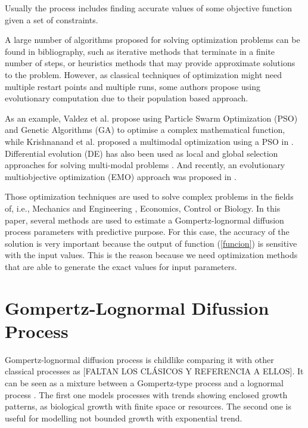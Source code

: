 \documentclass{sig-alternate}
\begin{document}
Usually the process includes finding accurate values of some objective
function given a set of constraints. %


A large number of algorithms proposed for solving optimization
problems can be found in bibliography, %
 such as iterative methods that terminate in a finite number of steps, or heuristics methods that may provide approximate solutions to the problem.
However, as classical techniques of optimization might need multiple
restart points and multiple runs, some authors propose using
evolutionary computation \cite{Pattnaik2001} due to their population
based approach. %

As an example, Valdez et al. \cite{Valdez2007,Valdez2007b,Valdez2008}
propose using Particle Swarm Optimization (PSO) and Genetic Algorithms
(GA) to optimise a complex mathematical function, while Krishnanand et
al. proposed a multimodal optimization using a PSO in
\cite{Krishnanand2009}. Differential evolution (DE) has also been used
as local and global selection approaches for solving multi-modal
problems \cite{Ronkkonen2009}. And recently, an evolutionary
multiobjective optimization (EMO) approach was proposed in
\cite{Deb2010,Saha2010}. %

Those optimization techniques are used to solve complex problems in the fields of, i.e., Mechanics and Engineering \cite{Tabucanon1996}, Economics, Control or Biology.
In this paper, several methods are used to estimate a
Gompertz-lognormal diffusion process parameters with predictive
purpose. For this case, the accuracy of the solution is very important
because the output of function (\ref{funcion}) is sensitive with the
input values. This is the reason because we need optimization methods
that are able to generate the exact values for input parameters.   


\section{Gompertz-Lognormal Difussion Process}
\label{sec:gompertz}

Gompertz-lognormal diffusion process is childlike comparing it with other classical processes as [FALTAN LOS CLÁSICOS Y REFERENCIA A ELLOS]. 
It can be seen as a mixture between a Gompertz-type process \cite{Gut07b} and a lognormal process \cite{GutCy}. The first one models processes with trends showing enclosed growth patterns, as biological growth with finite space or resources. The second one is useful for modelling not bounded growth with exponential trend.
\end{document}
